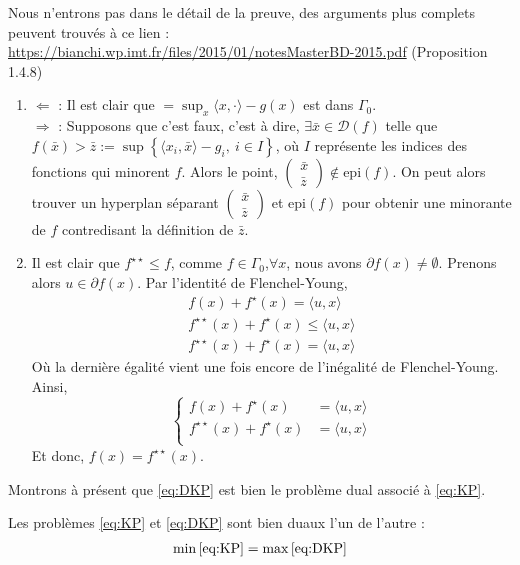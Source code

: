 \documentclass[a4paper,12pt]{article}
\begin{document}
\begin{preuve}
Nous n'entrons pas dans le détail de la preuve, des arguments plus complets peuvent trouvés à ce lien : \url{https://bianchi.wp.imt.fr/files/2015/01/notesMasterBD-2015.pdf} (Proposition 1.4.8)
\begin{enumerate}
\item $\Longleftarrow$ : Il est clair que $=\sup_x \langle x,\cdot \rangle -g(x)$ est dans $\Gamma_0$. \\
$\Longrightarrow$ : Supposons que c'est faux, c'est à dire, $\exists \bar{x}\in\mathcal{D}(f)$ telle que $f(\bar{x})>\bar{z}:=\sup\left\{\langle x_i,\bar{x}\rangle - g_i,\ i\in I\right\}$, où $I$ représente les indices des fonctions qui minorent $f$. Alors le point, $\begin{pmatrix}
\bar{x}\\
\bar{z}
\end{pmatrix}\notin \text{epi}(f)$. On peut alors trouver un hyperplan séparant $\begin{pmatrix}
\bar{x}\\
\bar{z}
\end{pmatrix}$ et $\text{epi}(f)$ pour obtenir une minorante de $f$ contredisant la définition de $\bar{z}$.
\item Il est clair que $f^{\star\star}\leq f$, comme $f\in\Gamma_0$,$\forall x$, nous avons $\partial f(x)\neq \emptyset$. Prenons alors $u\in\partial f(x)$. 
Par l'identité de Flenchel-Young, 
\begin{align*}
f(x) + f^{\star}(x) = \langle u,x\rangle\\
f^{\star\star}(x)+f^{\star}(x)\leq \langle u,x\rangle\\
f^{\star\star}(x)+f^{\star}(x) = \langle u,x\rangle
\end{align*}
Où la dernière égalité vient une fois encore de l'inégalité de Flenchel-Young. Ainsi, 
$$
\left\{
\begin{array}{cl}
f(x) + f^{\star}(x) &= \langle u,x\rangle\\
f^{\star\star}(x)+f^{\star}(x) &= \langle u,x\rangle\\
\end{array}
\right.
$$
Et donc, $f(x)=f^{\star\star}(x)$.
\end{enumerate}
\end{preuve}
\newpage
Montrons à présent que \eqref{eq:DKP} est bien le problème dual associé à \eqref{eq:KP}. 
\begin{theoreme}{}
\label{thm:dualite}
Les problèmes \eqref{eq:KP} et \eqref{eq:DKP} sont bien duaux l'un de l'autre :
\begin{align}
\min\eqref{eq:KP} = \max\eqref{eq:DKP}
\end{align}
\end{theoreme}
\end{document}
